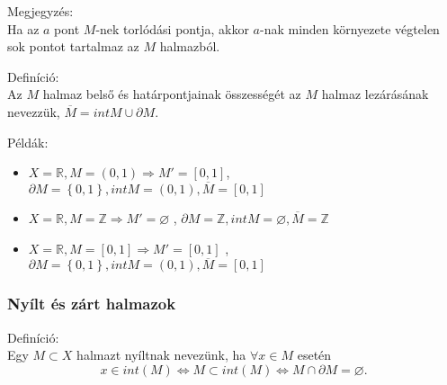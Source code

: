 \documentclass[]{scrartcl}
\providecommand{\tightlist}{%
  \setlength{\itemsep}{0pt}\setlength{\parskip}{0pt}}
\newenvironment{definicio}{}{}
\newenvironment{pelda}{}{}
\newenvironment{megjegyzes}{}{}
\begin{document}
\begin{megjegyzes}

Megjegyzés:\\
Ha az \(a\) pont \(M\)-nek torlódási pontja, akkor \(a\)-nak minden
környezete végtelen sok pontot tartalmaz az \(M\) halmazból.

\end{megjegyzes}

\begin{definicio}

Definíció:\\
Az \(M\) halmaz belső és határpontjainak összességét az \(M\) halmaz
lezárásának nevezzük, \(\overline{M} = {int}M \cup \partial M\).

\end{definicio}

\begin{pelda}

Példák:

\begin{itemize}
\tightlist
\item
  \(\left. X = {\mathbb{R}},M = \left( 0,1 \right)\Rightarrow M' = \left\lbrack 0,1 \right\rbrack \right.\),
  \(\partial M = \left\{ 0,1 \right\},{int}M = \left( 0,1 \right),\overline{M} = \left\lbrack 0,1 \right\rbrack\)
\item
  \(\left. X = {\mathbb{R}},M = {\mathbb{Z}}\Rightarrow M' = \varnothing \right.\)
  ,
  \(\partial M = {\mathbb{Z}},{int}M = \varnothing,\overline{M} = {\mathbb{Z}}\)
\item
  \(\left. X = {\mathbb{R}},M = \left\lbrack 0,1 \right\rbrack\Rightarrow M' = \left\lbrack 0,1 \right\rbrack \right.\)
  ,
  \(\partial M = \left\{ 0,1 \right\},{int}M = \left( 0,1 \right),\overline{M} = \left\lbrack 0,1 \right\rbrack\)
\end{itemize}

\end{pelda}

\subsubsection{Nyílt és zárt halmazok}\label{nyilt-es-zart-halmazok}

\begin{definicio}

Definíció:\\
Egy \(M \subset X\) halmazt nyíltnak nevezünk, ha \(\forall x \in M\)
esetén
\[\left. x \in {int}\left( M \right)\Leftrightarrow M \subset {int}\left( M \right)\Leftrightarrow M \cap \partial M = \varnothing. \right.\]

\end{definicio}
\end{document}

